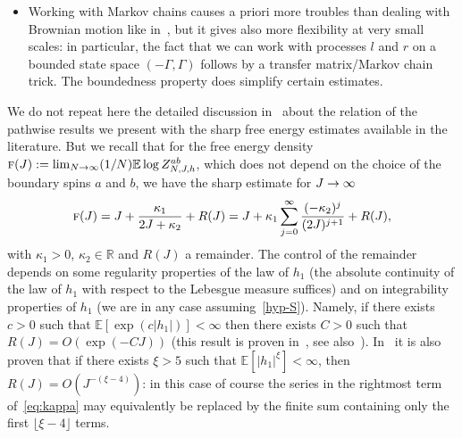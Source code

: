 \documentclass[AHL,Unicode,longabstracts,published]{cedram}
\newcommand{\bbE}{\mathbb{E}}
\newcommand{\bbR}{\mathbb{R}}
\newcommand{\gG}{\Gamma}
\newcommand{\tf}{\textsc{f}}
\renewcommand*{\to}{\mathchoice{\longrightarrow}{\rightarrow}{\rightarrow}{\rightarrow}}
\begin{document}
\begin{itemize}
\item Working with Markov chains causes a priori more troubles than dealing with Brownian motion like in~\cite{cf:CGH1}, but it gives also more flexibility at very small scales: in particular, the fact that we can work with processes $l$ and $r$ on a bounded state space $(-\gG,\gG)$ follows by a transfer matrix/Markov chain trick. The boundedness property does simplify certain estimates.
\end{itemize}


We do not repeat here the detailed discussion in~\cite[Section~2.4]{cf:CGH1} about the relation of the pathwise results we present with the sharp free energy estimates available in the literature. But we recall that for the free energy density $\tf (J):= \lim_{N \to \infty}(1/N) \bbE\log Z_{N, J, h}^{ab}$, which does not depend on the choice of the boundary spins $a$ and $b$, we have the sharp estimate for $J \to \infty$
\begin{equation}\label{eq:kappa}
\tf (J) = J+\frac{\kappa_1}{2J + \kappa_2} +R(J)= J+ \kappa_1 \sum_{j=0}^\infty \frac{(-\kappa_2)^j}{(2J)^{j+1}}+R(J),
\end{equation}
with $\kappa_1>0$, $\kappa_2\in \bbR$ and $R(J)$ a remainder. The control of the remainder depends on some regularity properties of the law of $h_1$ (the absolute continuity of the law of $h_1$ with respect to the Lebesgue measure suffices) and on integrability properties of $h_1$ (we are in any case assuming~\eqref{hyp-S}). Namely, if there exists $c>0$ such that $\bbE[\exp(c | h_1 |)]< \infty$ then there exists $C>0$ such that $R(J)=O(\exp(-CJ))$ (this result is proven in~\cite{cf:CGGH}, see also~\cite{cf:GG22}). In~\cite{cf:CGGH} it is also proven that if there exists $\xi>5$ such that $\bbE[| h_1 | ^\xi] < \infty$, then $R(J)=O(J^{-(\xi-4)})$: in this case of course the series in the rightmost term of~\eqref{eq:kappa} may equivalently be replaced by the finite sum containing only the first $\lfloor \xi-4\rfloor$ terms.
\end{document}
